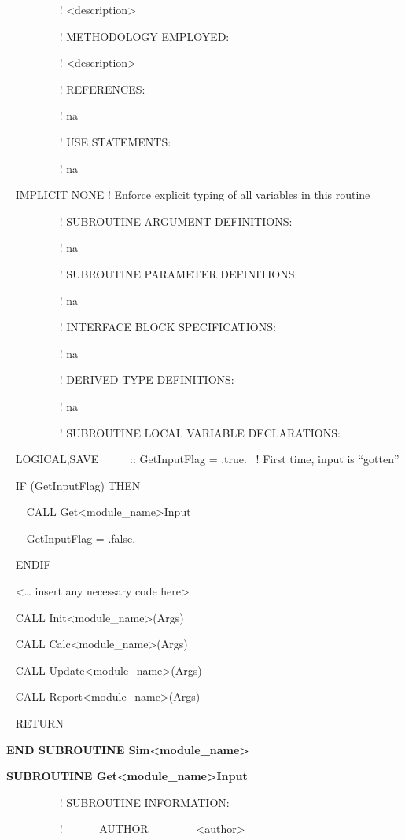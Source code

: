~~~~~~~~~ ! \textless{}description\textgreater{}

~~~~~~~~~ ! METHODOLOGY EMPLOYED:

~~~~~~~~~ ! \textless{}description\textgreater{}

~~~~~~~~~ ! REFERENCES:

~~~~~~~~~ ! na

~~~~~~~~~ ! USE STATEMENTS:

~~~~~~~~~ ! na

~ IMPLICIT NONE ! Enforce explicit typing of all variables in this routine

~~~~~~~~~ ! SUBROUTINE ARGUMENT DEFINITIONS:

~~~~~~~~~ ! na

~~~~~~~~~ ! SUBROUTINE PARAMETER DEFINITIONS:

~~~~~~~~~ ! na

~~~~~~~~~ ! INTERFACE BLOCK SPECIFICATIONS:

~~~~~~~~~ ! na

~~~~~~~~~ ! DERIVED TYPE DEFINITIONS:

~~~~~~~~~ ! na

~~~~~~~~~ ! SUBROUTINE LOCAL VARIABLE DECLARATIONS:

~ LOGICAL,SAVE~~~~~ :: GetInputFlag = .true.~ ! First time, input is ``gotten''

~ IF (GetInputFlag) THEN

~~~ CALL Get\textless{}module\_name\textgreater{}Input

~~~ GetInputFlag = .false.

~ ENDIF

~ \textless{}\ldots{} insert any necessary code here\textgreater{}

~ CALL Init\textless{}module\_name\textgreater{}(Args)

~ CALL Calc\textless{}module\_name\textgreater{}(Args)

~ CALL Update\textless{}module\_name\textgreater{}(Args)

~ CALL Report\textless{}module\_name\textgreater{}(Args)

~ RETURN

\textbf{END SUBROUTINE Sim\textless{}module\_name\textgreater{}}

\textbf{SUBROUTINE Get\textless{}module\_name\textgreater{}Input}

~~~~~~~~~ ! SUBROUTINE INFORMATION:

~~~~~~~~~ !~~~~~~ AUTHOR~~~~~~~~ \textless{}author\textgreater{}

